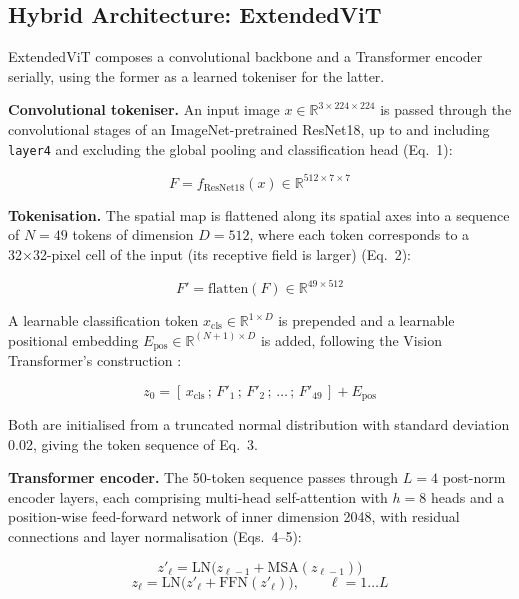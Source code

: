 \hypertarget{proposed-method-extendedvit}{%
\subsection{Hybrid Architecture: ExtendedViT}\label{proposed-method-extendedvit}}

ExtendedViT composes a convolutional backbone and a Transformer encoder
serially, using the former as a learned tokeniser for the latter.

\textbf{Convolutional tokeniser.} An input image
\(x \in \mathbb{R}^{3 \times 224 \times 224}\) is passed through the
convolutional stages of an ImageNet-pretrained ResNet18, up to and
including \texttt{layer4} and excluding the global pooling and
classification head (Eq.~1):

\begin{equation}
F = f_{\text{ResNet18}}(x) \in \mathbb{R}^{512 \times 7 \times 7}
\end{equation}

\textbf{Tokenisation.} The spatial map is flattened along its spatial
axes into a sequence of \(N = 49\) tokens of dimension \(D = 512\),
where each token corresponds to a 32×32-pixel cell of the input (its receptive field is larger)
(Eq.~2):

\begin{equation}
F' = \text{flatten}(F) \in \mathbb{R}^{49 \times 512}
\end{equation}

A learnable classification token
\(x_{\text{cls}} \in \mathbb{R}^{1 \times D}\) is prepended and a
learnable positional embedding
\(E_{\text{pos}} \in \mathbb{R}^{(N+1) \times D}\) is added, following
the Vision Transformer's construction \citep{ref22}:

\begin{equation}
z_0 = [\,x_{\text{cls}}\,;\,F'_1\,;\,F'_2\,;\,\dots\,;\,F'_{49}\,] + E_{\text{pos}}
\end{equation}

Both are initialised from a truncated normal distribution with standard
deviation 0.02, giving the token sequence of Eq.~3.

\textbf{Transformer encoder.} The 50-token sequence passes through
\(L = 4\) post-norm encoder layers, each comprising multi-head
self-attention with \(h = 8\) heads and a position-wise feed-forward
network of inner dimension 2048, with residual connections and layer
normalisation (Eqs.~4--5):

\begin{equation}
z'_\ell = \text{LN}\big(z_{\ell-1} + \text{MSA}(z_{\ell-1})\big)
\end{equation}
\begin{equation}
z_\ell = \text{LN}\big(z'_\ell + \text{FFN}(z'_\ell)\big), \qquad \ell = 1 \dots L
\end{equation}

